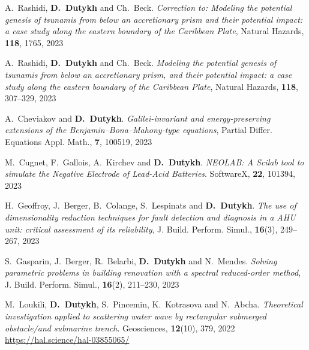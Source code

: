 \begin{etaremune}
  \item A.~Rashidi, \textbf{D.~Dutykh} and Ch.~Beck. \textit{Correction to: Modeling the potential genesis of tsunamis from below an accretionary prism and their potential impact: a case study along the eastern boundary of the Caribbean Plate}, Natural Hazards, \textbf{118}, 1765, 2023 %
  
  \item A.~Rashidi, \textbf{D.~Dutykh} and Ch.~Beck. \textit{Modeling the potential genesis of tsunamis from below an accretionary prism, and their potential impact: a case study along the eastern boundary of the Caribbean Plate}, Natural Hazards, \textbf{118}, 307--329, 2023 %

  \item A.~Cheviakov and \textbf{D.~Dutykh}. \textit{Galilei-invariant and energy-preserving extensions of the Benjamin--Bona--Mahony-type equations}, Partial Differ. Equations Appl. Math., \textbf{7}, 100519, 2023 %

  \item M.~Cugnet, F.~Gallois, A.~Kirchev and \textbf{D.~Dutykh}. \textit{NEOLAB: A Scilab tool to simulate the Negative Electrode of Lead-Acid Batteries}. SoftwareX, \textbf{22}, 101394, 2023 %
  
  \item H.~Geoffroy, J.~Berger, B.~Colange, S.~Lespinats and \textbf{D.~Dutykh}. \textit{The use of dimensionality reduction techniques for fault detection and diagnosis in a AHU unit: critical assessment of its reliability}, J. Build. Perform. Simul., \textbf{16}(3), 249--267, 2023 %

  \item S.~Gasparin, J.~Berger, R.~Belarbi, \textbf{D.~Dutykh} and N.~Mendes. \textit{Solving parametric problems in building renovation with a spectral reduced-order method}, J. Build. Perform. Simul., \textbf{16}(2), 211--230, 2023 %


  
  \item M.~Loukili, \textbf{D.~Dutykh}, S.~Pincemin, K.~Kotrasova and N.~Abcha. \textit{Theoretical investigation applied to scattering water wave by rectangular submerged obstacle/and submarine trench}. Geosciences, \textbf{12}(10), 379, 2022 \\ %
  \url{https://hal.science/hal-03855065/}
  

\end{etaremune}
